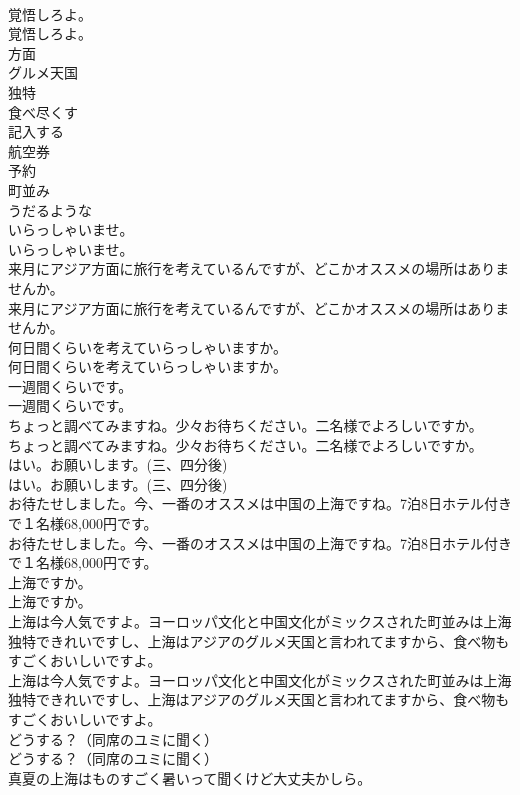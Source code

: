 \documentclass[8pt]{extreport}
\begin{document}
\begin{CJK}{UTF8}{min}
\\	覚悟しろよ。	
\\	覚悟しろよ。 
\\	方面
\\	グルメ天国
\\	独特
\\	食べ尽くす
\\	記入する
\\	航空券
\\	予約
\\	町並み
\\	うだるような
\\	いらっしゃいませ。	
\\	いらっしゃいませ。 
\\	来月にアジア方面に旅行を考えているんですが、どこかオススメの場所はありませんか。	
\\	来月にアジア方面に旅行を考えているんですが、どこかオススメの場所はありませんか。 
\\	何日間くらいを考えていらっしゃいますか。	
\\	何日間くらいを考えていらっしゃいますか。 
\\	一週間くらいです。	
\\	一週間くらいです。 
\\	ちょっと調べてみますね。少々お待ちください。二名様でよろしいですか。	
\\	ちょっと調べてみますね。少々お待ちください。二名様でよろしいですか。 
\\	はい。お願いします。(三、四分後)	
\\	はい。お願いします。(三、四分後) 
\\	お待たせしました。今、一番のオススメは中国の上海ですね。7泊8日ホテル付きで１名様68,000円です。	
\\	お待たせしました。今、一番のオススメは中国の上海ですね。7泊8日ホテル付きで１名様68,000円です。 
\\	上海ですか。	
\\	上海ですか。 
\\	上海は今人気ですよ。ヨーロッパ文化と中国文化がミックスされた町並みは上海独特できれいですし、上海はアジアのグルメ天国と言われてますから、食べ物もすごくおいしいですよ。	
\\	上海は今人気ですよ。ヨーロッパ文化と中国文化がミックスされた町並みは上海独特できれいですし、上海はアジアのグルメ天国と言われてますから、食べ物もすごくおいしいですよ。 
\\	どうする？（同席のユミに聞く）	
\\	どうする？（同席のユミに聞く） 
\\	真夏の上海はものすごく暑いって聞くけど大丈夫かしら。	

\end{CJK}
\end{document}
